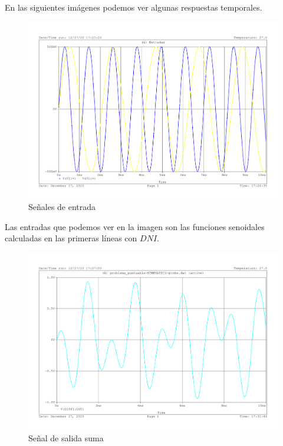 {  En las siguientes imágenes podemos ver algunas respuestas temporales.
    \begin{figure}[H]
    \centering  
    \includegraphics[scale=0.5]{images/problema_puntuable_6_entrada.pdf}
    \caption{Señales de entrada}
  \end{figure}
  Las entradas que podemos ver en la imagen son las funciones
  senoidales calculadas en las primeras líneas con $DNI$.
  \begin{figure}[H]
    \centering  
    \includegraphics[scale=0.5,page=2]{images/problema_puntuable_6_suma_resta_individual.pdf}
    \caption{Señal de salida suma}
  \end{figure}

}
